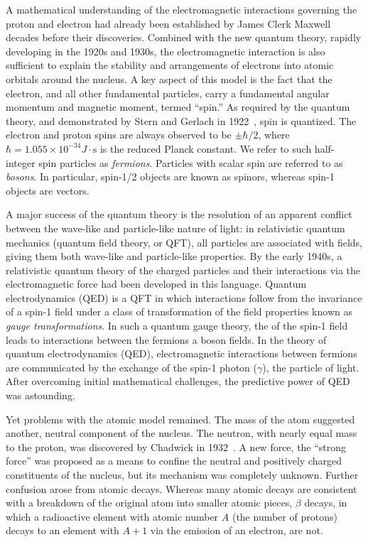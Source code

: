 A mathematical understanding of the electromagnetic interactions 
governing the proton and electron had
already been established by James Clerk Maxwell decades before their discoveries.
Combined with the new quantum theory, rapidly developing in the 1920s and 1930s, the electromagnetic
interaction is also sufficient to explain the stability and arrangements of
electrons into atomic orbitals around the nucleus. 
A key aspect of this model is the fact that the electron, and all other
fundamental particles, carry a fundamental
angular momentum and magnetic moment, termed ``spin.'' 
As required by the quantum theory, and 
demonstrated by Stern and Gerlach in 1922~\cite{1922ZPhy....9..349G},
spin is quantized.
The electron and proton spins are always observed to be $\pm\hbar/2$, where 
$\hbar=1.055\times 10^{-34}\unit{J}\cdot\mathrm{s}$
is the reduced Planck constant.
We refer to such half-integer spin particles as \emph{fermions}. Particles
with scalar spin are referred to as \emph{bosons}. In particular, spin-1/2 objects
are known as spinors, whereas spin-1 objects are vectors.

A major success of the quantum theory is the resolution of an apparent
conflict between the wave-like and particle-like nature of light:
in relativistic quantum mechanics (quantum field theory, or QFT), all particles are associated with fields, giving
them both wave-like and particle-like properties. 
By the early 1940s, a relativistic quantum theory of the charged particles
and their interactions via the electromagnetic force had been developed in 
this language. 
Quantum electrodynamics (QED) is a QFT in which interactions 
follow from the invariance of a spin-1 field under a class of transformation of the field properties
known as \emph{gauge transformations}.
In such a quantum gauge theory, the  of the spin-1 field leads to interactions between the fermions
a boson fields.
In the theory of quantum electrodynamics (QED),
electromagnetic interactions 
between fermions are communicated by the 
exchange of the spin-1 photon ($\gamma$),
the particle of light. After overcoming initial mathematical challenges, 
the predictive power of QED was astounding.

Yet problems with the atomic model remained. The mass of the atom
suggested another, neutral component of the nucleus. 
The neutron, with nearly equal mass to the proton, was
discovered by Chadwick in 1932~\cite{Chadwick:1932ma,doi:10.1098/rspa.1933.0152}. A new force, the ``strong force'' was proposed as
a means to 
confine the neutral and positively charged constituents of the nucleus,
but its mechanism was completely unknown.
Further confusion arose from atomic decays. Whereas many atomic
decays are consistent with a breakdown of the original atom into 
smaller atomic pieces, $\beta$ decays,
in which a radioactive element with atomic number $A$ 
(the number of protons) decays to an element with $A+1$
via the emission of an electron, are not. 

